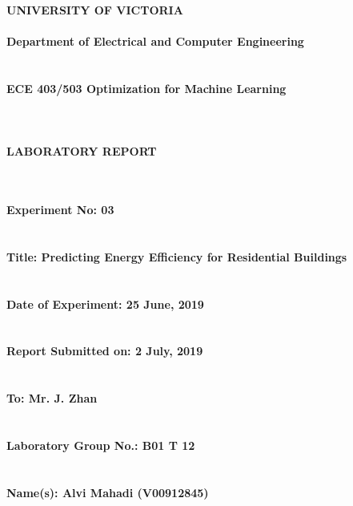 \documentclass[11pt,a4paper,twoside]{article}
\begin{document}
\begin{center}
{\bf {\Huge UNIVERSITY OF VICTORIA} ~\\
	~\\
	{\huge Department of Electrical and Computer Engineering} ~\\
	~\\
	~\\
	{\huge ECE 403/503 Optimization for Machine Learning} ~\\
	~\\
	~\\
	~\\
	{\huge LABORATORY REPORT}
	~\\
	~\\
	~\\
}
\end{center}
{\bf
{\LARGE Experiment No: 03}
~\\
~\\
~\\
{\LARGE Title: Predicting Energy Efficiency for Residential Buildings}
~\\
~\\
~\\
{\LARGE Date of Experiment: 25 June, 2019}
~\\
~\\
~\\
{\LARGE Report Submitted on: 2 July, 2019}
~\\
~\\
~\\
{\LARGE To: Mr. J. Zhan}
~\\
~\\
~\\
{\LARGE Laboratory Group No.: B01 T 12}
~\\
~\\
~\\
{\LARGE Name(s): Alvi Mahadi (V00912845)}
~\\
~\\
~\\
}

\newpage



\end{document}
